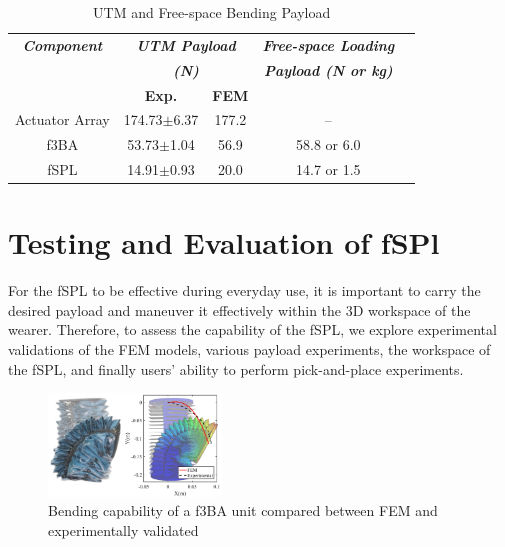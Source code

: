 \documentclass[letterpaper, 10 pt, conference]{ieeeconf}  %
\begin{document}
\begin{table}[t!]
\caption{UTM and Free-space Bending Payload} 
\label{tab:payload_table}
	\begin{tabularx}{0.48\textwidth}{c|c| c|c c}   \toprule\toprule
    \centering
    \small
    \setlength\tabcolsep{11pt}
	\textbf{\emph{Component}} & \multicolumn{2}{c|}{\textbf{\emph{UTM Payload }}} & \textbf{\emph{Free-space Loading}} \\[-1pt]
                             &\multicolumn{2}{c|}{\textbf{\emph{(N) }}}  	&\textbf{\emph{Payload (N or kg)}}	\\\midrule
                            
					&	\textbf{Exp.}	&	\textbf{FEM}	&	\\\cline{2-3}\rule{0pt}{2.8ex}    

	
    Actuator Array 	&		174.73$\pm$6.37 	&177.2 	 & -- \\
    f3BA			&		53.73$\pm$1.04		&56.9	 & 58.8 or 6.0\\
    fSPL			& 		14.91$\pm$0.93	&20.0	 & 14.7 or 1.5\\\bottomrule 
    \hline
	\end{tabularx}
    \vspace{-1.5em}
\end{table}
\section{Testing and Evaluation of fSPl}
For the fSPL to be effective during everyday use, it is important to carry the desired payload and maneuver it effectively within the 3D workspace of the wearer. Therefore, to assess the capability of the fSPL, we explore experimental validations of the FEM models, various payload experiments, the workspace of the fSPL, and finally users' ability to perform pick-and-place experiments.
% 



\begin{figure}[t!]
\centering
\includegraphics[width=0.41\textwidth]{Figures/fem_real_v4}
\setlength{\belowcaptionskip}{-18pt}
\caption{Bending capability of a f3BA unit compared between FEM and experimentally validated}
\label{fig:f3CAs_bend_fem_real}

\end{figure}
\end{document}
